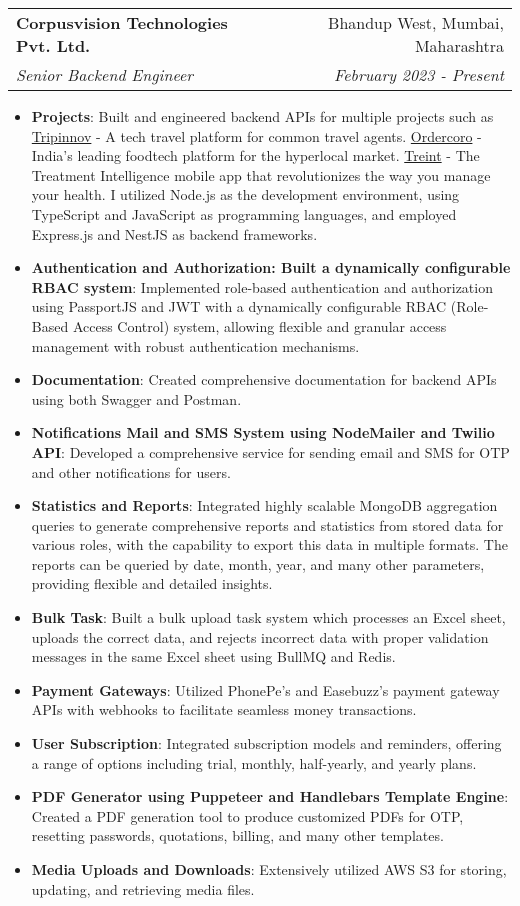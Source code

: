 \documentclass[letterpaper,11pt]{article}
\makeatletter
\newcommand{\resumeItem}[2]{
  \item\small{
    \textbf{#1}{: #2 \vspace{-2pt}}
  }
}
\newcommand{\resumeSubheading}[4]{
  \vspace{-1pt}\item
    \begin{tabular*}{0.97\textwidth}{l@{\extracolsep{\fill}}r}
      \textbf{#1} & #2 \\
      \textit{\small#3} & \textit{\small #4} \\
    \end{tabular*}\vspace{-5pt}
}
\newcommand{\resumeItemListStart}{\begin{itemize}}
\newcommand{\resumeItemListEnd}{\end{itemize}\vspace{-5pt}}
\makeatother
\begin{document}
  \resumeSubheading
  {Corpusvision Technologies Pvt. Ltd.}{Bhandup West, Mumbai, Maharashtra}
  {Senior Backend Engineer}{February 2023 - Present}
  \resumeItemListStart
  \resumeItem{Projects}
       {Built and engineered backend APIs for multiple projects such as
       \href{https://tripinnov.com/}{Tripinnov} - A tech travel platform for common travel agents.
       \href{https://www.ordercoro.com/}{Ordercoro} - India’s leading foodtech platform for the hyperlocal market.
       \href{https://treint.com/}{Treint} - The Treatment Intelligence mobile app that revolutionizes the way you manage your health.
       I utilized Node.js as the development environment, using TypeScript and JavaScript as programming languages, and employed Express.js and NestJS as backend frameworks.
       }
    \resumeItem{Authentication and Authorization: Built a dynamically configurable RBAC system}
        {Implemented role-based authentication and authorization using PassportJS and JWT with a dynamically configurable RBAC (Role-Based Access Control) system, allowing flexible and granular access management with robust authentication mechanisms.}
    \resumeItem{Documentation}
        {Created comprehensive documentation for backend APIs using both Swagger and Postman.}
    \resumeItem{Notifications Mail and SMS System using NodeMailer and Twilio API}
        {Developed a comprehensive service for sending email and SMS for OTP and other notifications for users.}
    \resumeItem{Statistics and Reports}
        {Integrated highly scalable MongoDB aggregation queries to generate comprehensive reports and statistics from stored data for various roles, with the capability to export this data in multiple formats. The reports can be queried by date, month, year, and many other parameters, providing flexible and detailed insights.}
    \resumeItem{Bulk Task}
        {Built a bulk upload task system which processes an Excel sheet, uploads the correct data, and rejects incorrect data with proper validation messages in the same Excel sheet using BullMQ and Redis.}
    \resumeItem{Payment Gateways}
        {Utilized PhonePe's and Easebuzz's payment gateway APIs with webhooks to facilitate seamless money transactions.}
    \resumeItem{User Subscription}
        {Integrated subscription models and reminders, offering a range of options including trial, monthly, half-yearly, and yearly plans.}
    \resumeItem{PDF Generator using Puppeteer and Handlebars Template Engine}
        {Created a PDF generation tool to produce customized PDFs for OTP, resetting passwords, quotations, billing, and many other templates.}
    \resumeItem{Media Uploads and Downloads}
        {Extensively utilized AWS S3 for storing, updating, and retrieving media files.}
  \resumeItemListEnd
\end{document}
